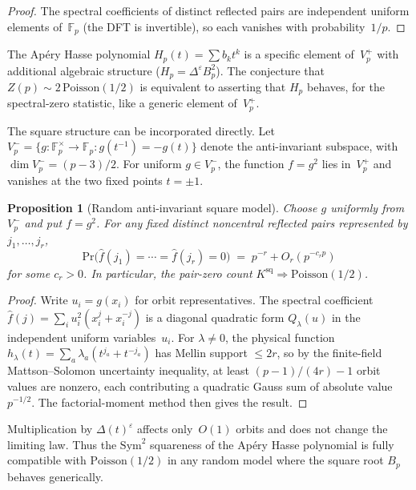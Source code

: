 \documentclass[11pt]{article}
\newtheorem{proposition}[theorem]{Proposition}
\theoremstyle{definition}
\theoremstyle{remark}
\begin{document}
\begin{proof}
The spectral coefficients of distinct reflected pairs
are independent uniform elements of~$\mathbb{F}_p$
(the DFT is invertible), so each vanishes with
probability~$1/p$.
\end{proof}

The Ap\'ery Hasse polynomial $H_p(t) = \sum b_k t^k$
is a specific element of~$V_p^+$ with additional
algebraic structure ($H_p = \Delta^\varepsilon B_p^2$).
The conjecture that $Z(p) \sim 2\,\mathrm{Poisson}(1/2)$
is equivalent to asserting that $H_p$ behaves, for
the spectral-zero statistic, like a generic element
of~$V_p^+$.

The square structure can be incorporated directly.
Let $V_p^- = \{g \colon \mathbb{F}_p^\times \to \mathbb{F}_p
: g(t^{-1}) = -g(t)\}$ denote the anti-invariant subspace,
with $\dim V_p^- = (p{-}3)/2$.
For uniform $g \in V_p^-$, the function $f = g^2$
lies in~$V_p^+$ and vanishes at the two fixed points
$t = \pm 1$.

\begin{proposition}[Random anti-invariant square model]%
\label{prop:random-sq}
Choose $g$ uniformly from~$V_p^-$ and put $f = g^2$.
For any fixed distinct noncentral reflected pairs
represented by $j_1, \ldots, j_r$,
\[
  \mathrm{Pr}\bigl(\hat{f}(j_1) = \cdots = \hat{f}(j_r) = 0\bigr)
  \;=\; p^{-r} + O_r(p^{-c_r p})
\]
for some $c_r > 0$.
In particular, the pair-zero count
$K^{\mathrm{sq}} \Rightarrow \mathrm{Poisson}(1/2)$.
\end{proposition}

\begin{proof}
Write $u_i = g(x_i)$ for orbit representatives.
The spectral coefficient
$\hat{f}(j) = \sum_i u_i^2(x_i^j + x_i^{-j})$
is a diagonal quadratic form $Q_\lambda(u)$ in
the independent uniform variables~$u_i$.
For $\lambda \ne 0$, the physical function
$h_\lambda(t) = \sum_a \lambda_a(t^{j_a} + t^{-j_a})$
has Mellin support $\le 2r$, so by the finite-field
Mattson--Solomon uncertainty inequality, at least
$(p{-}1)/(4r) - 1$ orbit values are nonzero,
each contributing a quadratic Gauss sum of
absolute value~$p^{-1/2}$.
The factorial-moment method then gives the result.
\end{proof}

Multiplication by $\Delta(t)^\varepsilon$ affects only~$O(1)$
orbits and does not change the limiting law.
Thus the $\mathrm{Sym}^2$ squareness of the Ap\'ery Hasse
polynomial is fully compatible with $\mathrm{Poisson}(1/2)$
in any random model where the square root $B_p$ behaves
generically.
\end{document}
